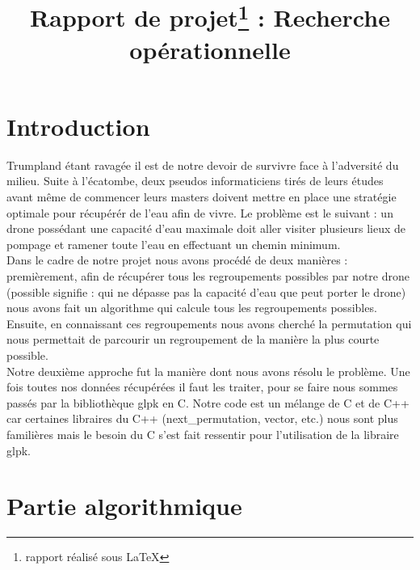 \documentclass[a4paper,sffamily,12pt]{article}
\title{\vspace{\fill}\LARGE\bfseries\sffamily Rapport de projet\protect\footnote{rapport réalisé sous \LaTeX} : Recherche opérationnelle\vspace{\fill}}
\begin{document}
	\date{} %
	\maketitle %

	\thispagestyle{fancy} %
	
	\newpage
			
	\renewcommand{\contentsname}{Sommaire}
	\tableofcontents
	
	\newpage
	
	\section{Introduction}
	
		\vspace{0.5cm}

		Trumpland étant ravagée il est de notre devoir de survivre face à l'adversité du milieu. Suite à l'écatombe, deux pseudos informaticiens tirés de leurs études avant même de commencer leurs masters doivent mettre en place une stratégie optimale pour récupérér de l'eau afin de vivre. Le problème est le suivant : un drone possédant une capacité d'eau maximale doit aller visiter plusieurs lieux de pompage et ramener toute l'eau en effectuant un chemin minimum.\\
		\indent Dans le cadre de notre projet nous avons procédé de deux manières : premièrement, afin de récupérer tous les regroupements possibles par notre drone (possible signifie : qui ne dépasse pas la capacité d'eau que peut porter le drone) nous avons fait un algorithme qui calcule tous les regroupements possibles. Ensuite, en connaissant ces regroupements nous avons cherché la permutation qui nous permettait de parcourir un regroupement de la manière la plus courte possible. \\
		\indent Notre deuxième approche fut la manière dont nous avons résolu le problème. Une fois toutes nos données récupérées il faut les traiter, pour se faire nous sommes passés par la bibliothèque glpk en C. Notre code est un mélange de C et de C++ car certaines libraires du C++ (next\_permutation, vector, etc.) nous sont plus familières mais le besoin du C s'est fait ressentir pour l'utilisation de la libraire glpk.

	\section{Partie algorithmique}
	
\end{document}
